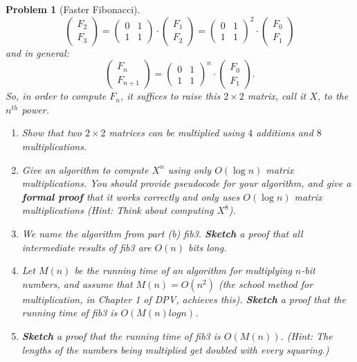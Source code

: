 \documentclass[10pt]{article}
\newtheorem{problem}{\sc\color{cit}Problem}
\begin{document}
\begin{problem}[Faster Fibonacci]
\[
    \begin{pmatrix} F_2 \\ F_3\end{pmatrix} = \begin{pmatrix} 0 & 1\\ 1& 1\end{pmatrix}\cdot \begin{pmatrix} F_1 \\ F_2\end{pmatrix}= \begin{pmatrix} 0 & 1\\ 1& 1\end{pmatrix}^2\cdot \begin{pmatrix} F_0 \\ F_1\end{pmatrix}
\]
and in general:
\[
    \begin{pmatrix} F_n \\ F_{n+1}\end{pmatrix} = \begin{pmatrix} 0 & 1\\ 1& 1\end{pmatrix}^n\cdot \begin{pmatrix} F_0 \\ F_1\end{pmatrix}.
\]
So, in order to compute $F_n$, it suffices to raise this $2 \times 2$ matrix, call it $X$, to the $n^{th}$ power.

\begin{enumerate}
    \item[(a)] Show that two $2 \times 2$ matrices can be multiplied using $4$ additions and $8$ multiplications.
    \item[(b)] Give an algorithm to compute $X^{n}$ using only $O(\log n)$ matrix multiplications. You should provide pseudocode for your algorithm, and give a \textbf{formal proof} that it works correctly and only uses $O(\log n)$ matrix multiplications (Hint: Think about computing $X^8$). 
    \item[(c)] We name the algorithm from part (b) \emph{fib3}. \textbf{Sketch} a proof that all intermediate results of \emph{fib3} are $O(n)$ bits long.
    \item[(d)] Let $M(n)$ be the running time of an algorithm for multiplying $n$-bit numbers, and assume that $M(n) = O(n^2)$ (the school method for multiplication, in Chapter 1 of DPV, achieves this). \textbf{Sketch} a proof that the running time of \emph{fib3} is $O(M (n) log n)$.
    \item[(e)] \textbf{Sketch} a proof that the running time of \emph{fib3} is $O(M (n))$. (Hint: The lengths of the numbers being multiplied get doubled with every squaring.)
\end{enumerate}
\end{problem}
\end{document}
